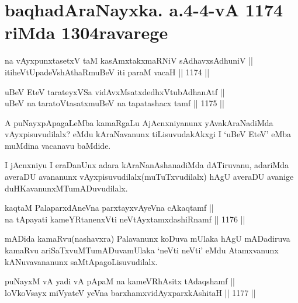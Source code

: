 \section*{baqhadAraNayxka. a.4-4-vA 1174 riMda 1304ravarege}

\begin{shl}
na vAyxpunxtasetxV taM kasAmxtakxmaRNiV sAdhavxsAdhuniV || \\
itiheVtUpadeVshAthaRmuBeV iti paraM vacaH \hfill || 1174 ||  
\end{shl}
				
\begin{shl}
uBeV EteV tarateyxVSa vidAvxMsatxdedhxVtubAdhanAtf || \\
uBeV na taratoV\s tasatxmuBeV na tapatashacx tamf \hfill || 1175 ||  
\end{shl}

\begin{artha}
A puNayxpApagaLeMba kamaRgaLu AjAcnxniyanunx yAvakAraNadiMda vAyxpisuvudilalx? eMdu 
kAraNavanunx tiLisuvudakAkxgi I `uBeV EteV' eMba muMdina vacanavu baMdide.
\end{artha}

\begin{artha}
I jAcnxniyu I eraDanUnx adara kAraNanAshanadiMda dATiruvanu, adariMda averaDU avananunx vAyxpisuvudilalx(muTuTxvudilalx) hAgU averaDU avanige duHKavanunxMTumADuvudilalx.
\end{artha}


\begin{shl}
kaqtaM PalaparxdAneVna parxtayxvAyeVna cAkaqtamf ||  \\
na tApayati kameYRtanenxVti neVtAyxtamxdashiRnamf \hfill || 1176 ||  
\end{shl}

\begin{artha}
mADida kamaRvu(nashavxra) Palavanunx koDuva mUlaka hAgU mADadiruva kamaRvu ariSaTxvuMTumADuvamUlaka `neVti neVti' eMdu Atamxvanunx kANuvavananunx saMtApagoLisuvudilalx.
\end{artha}


\begin{shl}
puNayxM vA yadi vA pApaM na kameVRhAsitx tAdaqshamf ||  \\
loVkoV\s sayx miVyateV yeVna barxhamxvidAyxparxkAshitaH \hfill || 1177 ||  
\end{shl}

